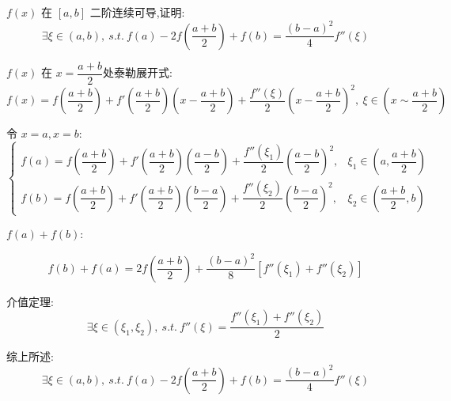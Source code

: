 \begin{proposition}
	$f(x)$ 在 $[a,b]$ 二阶连续可导,证明: $$\exists \xi\in(a,b),\ s.t.\ f(a)-2f(\dfrac{a+b}{2})+f(b)=\dfrac{(b-a)^2}{4}f''(\xi)$$
\end{proposition}
\begin{solution}

	$f(x)$ 在 $x=\dfrac{a+b}{2}$处泰勒展开式:
	$$f(x)=f(\frac{a+b}{2})+f'(\frac{a+b}{2})(x-\frac{a+b}{2})+\dfrac{f''(\xi)}{2}(x-\frac{a+b}{2})^2,\ \xi\in(x\sim \frac{a+b}{2})$$

	令 $x = a,x = b$:
	$$\begin{cases}
		f(a) = f(\dfrac{a+b}{2})+f'(\dfrac{a+b}{2})(\dfrac{a-b}{2})+\dfrac{f''(\xi_{1})}{2}(\dfrac{a-b}{2})^2, & \xi_{1}\in (a,\dfrac{a+b}{2}) \\
		f(b) = f(\dfrac{a+b}{2})+f'(\dfrac{a+b}{2})(\dfrac{b-a}{2})+\dfrac{f''(\xi_{2})}{2}(\dfrac{b-a}{2})^2, & \xi_{2}\in (\dfrac{a+b}{2},b)
	\end{cases}$$

	$f(a) + f(b)$:

	$$f(b)+f(a)=2f(\frac{a+b}{2})+\dfrac{(b-a)^2}{8}[f''(\xi_{1})+f''(\xi_{2})]$$

	介值定理:
	$$\exists\xi\in(\xi_{1},\xi_{2}),\ s.t.\ f''(\xi)=\dfrac{f''(\xi_{1})+f''(\xi_{2})}{2}$$

	综上所述:
	$$\exists \xi\in(a,b),\ s.t.\ f(a)-2f(\dfrac{a+b}{2})+f(b)=\dfrac{(b-a)^2}{4}f''(\xi)$$
\end{solution}

